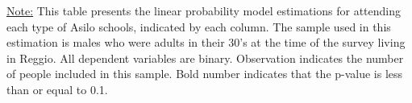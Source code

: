 \begin{footnotesize}
\noindent\underline{Note:} This table presents the linear probability model estimations for attending each type of Asilo schools, indicated by each column. The sample used in this estimation is males who were adults in their 30's at the time of the survey living in Reggio. All dependent variables are binary. Observation indicates the number of people included in this sample. Bold number indicates that the p-value is less than or equal to 0.1.
\end{footnotesize}
